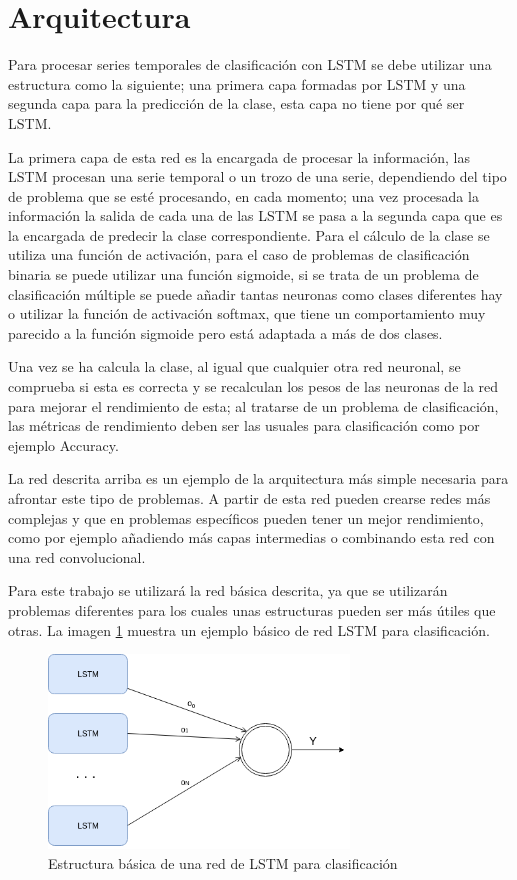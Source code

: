 \section{Arquitectura}
Para procesar series temporales de clasificación con LSTM se debe utilizar una estructura como la siguiente; una primera capa formadas por LSTM y una segunda capa para la predicción de la clase, esta capa no tiene por qué ser LSTM.\newline

La primera capa de esta red es la encargada de procesar la información, las LSTM procesan una serie temporal o un trozo de una serie, dependiendo del tipo de problema que se esté procesando, en cada momento; una vez procesada la información la salida de cada una de las LSTM se pasa a la segunda capa que es la encargada de predecir la clase correspondiente. Para el cálculo de la clase se utiliza una función de activación, para el caso de problemas de clasificación binaria se puede utilizar una función sigmoide, si se trata de un problema de clasificación múltiple se puede añadir tantas neuronas como clases diferentes hay o utilizar la función de activación softmax, que tiene un comportamiento muy parecido a la función sigmoide pero está adaptada a más de dos clases.\newline

Una vez se ha calcula la clase, al igual que cualquier otra red neuronal,  se comprueba si esta es correcta y se recalculan los pesos de las neuronas de la red para mejorar el rendimiento de esta; al tratarse de un problema de clasificación, las métricas de rendimiento deben ser las usuales para clasificación como por ejemplo Accuracy.\newline

La red descrita arriba es un ejemplo de la arquitectura más simple necesaria para afrontar este tipo de problemas. A partir de esta red pueden crearse redes más complejas y que en problemas específicos pueden tener un mejor rendimiento, como por ejemplo añadiendo más capas intermedias o combinando esta red con una red convolucional.\newline

Para este trabajo se utilizará la red básica descrita, ya que se utilizarán problemas diferentes para los cuales unas estructuras pueden ser más útiles que otras. La imagen \ref{fig:32} muestra un ejemplo básico de red LSTM para clasificación.

\begin{figure}[h]
	\centering
	\includegraphics[width=80mm]{imagenes/arquitectura_base.png}
	\caption{Estructura básica de una red de LSTM para clasificación}
	\label{fig:32}
\end{figure}
\verticalspace

